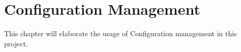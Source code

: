 \chapter{Configuration Management}
This chapter will elaborate the usage of Configuration management in this project. 

